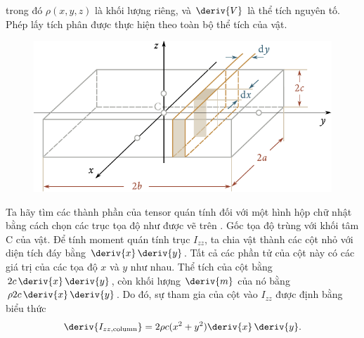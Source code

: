 \noindent
trong đó $\rho(x,y,z)$ là khối lượng riêng, và $\deriv{V}$ là thể tích nguyên tố. Phép lấy tích phân được thực hiện theo toàn bộ thể tích của vật.

\begin{figure}[!htb]
	\begin{center}
		\includegraphics[scale=0.8]{figures/ch_05/fig_5_17.pdf}
		\caption[]{}
		\label{fig:5_17}
	\end{center}
\end{figure}

Ta hãy tìm các thành phần của tensor quán tính đối với một hình hộp chữ nhật bằng cách chọn các trục tọa độ như được vẽ trên . Gốc tọa độ trùng với khối tâm C của vật. Để tính moment quán tính trục $I_{zz}$, ta chia vật thành các cột nhỏ với diện tích đáy bằng $\deriv{x}\,\deriv{y}$. Tất cả các phần tử của cột này có các giá trị của các tọa độ $x$ và $y$ như nhau. Thể tích của cột bằng $2c\,\deriv{x}\,\deriv{y}$, còn khối lượng $\deriv{m}$ của nó bằng $\rho 2c\,\deriv{x}\,\deriv{y}$. Do đó, sự tham gia của cột vào $I_{zz}$ được định bằng biểu thức
\begin{equation*}
\deriv{I_{zz,\text{column}}} = 2\rho c(x^2+y^2)\deriv{x}\,\deriv{y}.
\end{equation*}


